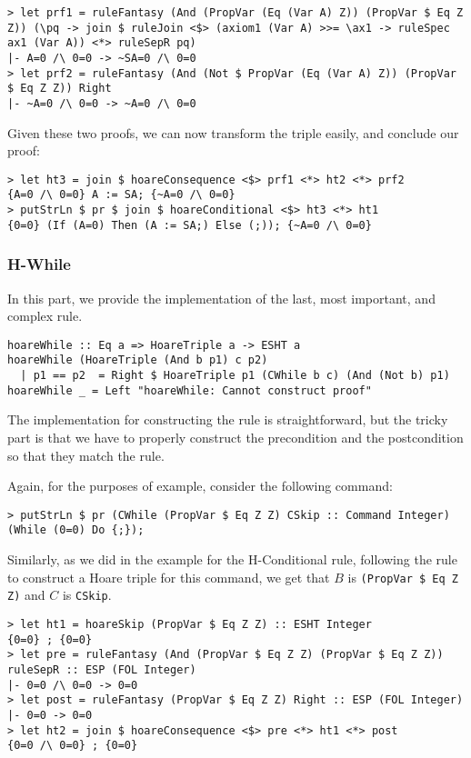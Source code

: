 \documentclass{article}
\begin{document}
\begin{lstlisting}
> let prf1 = ruleFantasy (And (PropVar (Eq (Var A) Z)) (PropVar $ Eq Z Z)) (\pq -> join $ ruleJoin <$> (axiom1 (Var A) >>= \ax1 -> ruleSpec ax1 (Var A)) <*> ruleSepR pq)
|- A=0 /\ 0=0 -> ~SA=0 /\ 0=0
> let prf2 = ruleFantasy (And (Not $ PropVar (Eq (Var A) Z)) (PropVar $ Eq Z Z)) Right
|- ~A=0 /\ 0=0 -> ~A=0 /\ 0=0
\end{lstlisting}

Given these two proofs, we can now transform the triple easily, and conclude our proof:

\begin{lstlisting}
> let ht3 = join $ hoareConsequence <$> prf1 <*> ht2 <*> prf2
{A=0 /\ 0=0} A := SA; {~A=0 /\ 0=0}
> putStrLn $ pr $ join $ hoareConditional <$> ht3 <*> ht1
{0=0} (If (A=0) Then (A := SA;) Else (;)); {~A=0 /\ 0=0}
\end{lstlisting}

\subsubsection{H-While}

In this part, we provide the implementation of the last, most important, and complex rule.

\begin{lstlisting}
hoareWhile :: Eq a => HoareTriple a -> ESHT a
hoareWhile (HoareTriple (And b p1) c p2)
  | p1 == p2  = Right $ HoareTriple p1 (CWhile b c) (And (Not b) p1)
hoareWhile _ = Left "hoareWhile: Cannot construct proof"
\end{lstlisting}

The implementation for constructing the rule is straightforward, but the tricky part is that we have to properly construct the precondition and the postcondition so that they match the rule.

Again, for the purposes of example, consider the following command:

\begin{lstlisting}
> putStrLn $ pr (CWhile (PropVar $ Eq Z Z) CSkip :: Command Integer)
(While (0=0) Do {;});
\end{lstlisting}

Similarly, as we did in the example for the H-Conditional rule, following the rule to construct a Hoare triple for this command, we get that $B$ is \texttt{(PropVar \$ Eq Z Z)} and $C$ is \texttt{CSkip}.

\begin{lstlisting}
> let ht1 = hoareSkip (PropVar $ Eq Z Z) :: ESHT Integer
{0=0} ; {0=0}
> let pre = ruleFantasy (And (PropVar $ Eq Z Z) (PropVar $ Eq Z Z)) ruleSepR :: ESP (FOL Integer)
|- 0=0 /\ 0=0 -> 0=0
> let post = ruleFantasy (PropVar $ Eq Z Z) Right :: ESP (FOL Integer)
|- 0=0 -> 0=0
> let ht2 = join $ hoareConsequence <$> pre <*> ht1 <*> post
{0=0 /\ 0=0} ; {0=0}
\end{lstlisting}
\end{document}
